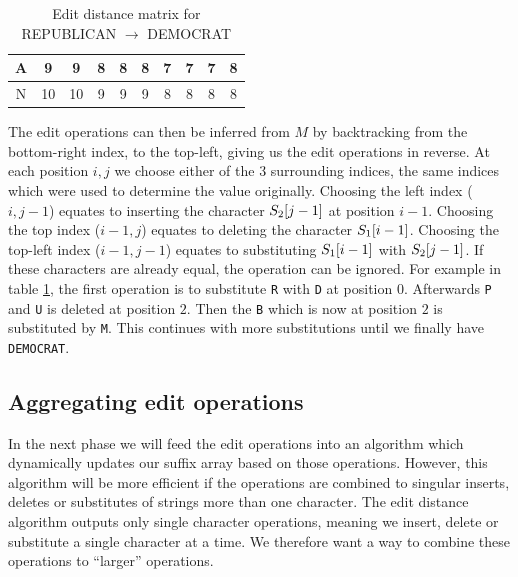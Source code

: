 \begin{table}
\begin{center}
\begin{tabular}[c]{c|c|c|c|c|c|c|c|c|c|}
			A & 9                    & 9                    & 8                    & 8                    & 8                    & 7                    & 7                    & \cellcolor{blue!25}7 & 8                    \\\hline
			N & 10                   & 10                   & 9                    & 9                    & 9                    & 8                    & 8                    & 8                    & \cellcolor{blue!25}8 \\\hline

			\hline
		\end{tabular}
	\end{center}
	\caption{Edit distance matrix for REPUBLICAN $\rightarrow$ DEMOCRAT}
	\label{tab:wagnerfischermatrix}
\end{table}


The edit operations can then be inferred from $M$ by backtracking from the bottom-right
index, to the top-left, giving us the edit operations in reverse. At each position $i, j$
we choose either of the 3 surrounding indices, the same indices which were used to
determine the value originally. Choosing the left index ($i, j - 1$) equates to inserting
the character $S_2[{j - 1}]$ at position $i - 1$. Choosing the top index ($i -
1, j$) equates to deleting the character $S_1[{i - 1}]$. Choosing the top-left
index ($i - 1, j - 1$) equates to substituting $S_1[{i - 1}]$ with
$S_2[{j - 1}]$. If these characters are already equal, the operation can be
ignored. For example in table \ref{tab:wagnerfischermatrix}, the first operation is to
substitute \verb|R| with \verb|D| at position $0$. Afterwards \verb|P| and \verb|U| is
deleted at position $2$. Then the \verb|B| which is now at position $2$ is substituted by
\verb|M|. This continues with more substitutions until we finally have \verb|DEMOCRAT|.

\subsection*{Aggregating edit operations}

In the next phase we will feed the edit operations into an algorithm which dynamically
updates our suffix array based on those operations. However, this algorithm will be more
efficient if the operations are combined to singular inserts, deletes or substitutes of
strings more than one character. The edit distance algorithm outputs only single character
operations, meaning we insert, delete or substitute a single character at a time. We
therefore want a way to combine these operations to ``larger'' operations.

